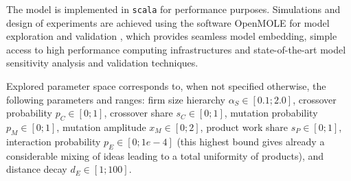 \documentclass[letterpaper]{article}
\begin{document}




The model is implemented in \texttt{scala} for performance purposes. Simulations and design of experiments are achieved using the software OpenMOLE for model exploration and validation \citep{reuillon2013openmole}, which provides seamless model embedding, simple access to high performance computing infrastructures and state-of-the-art model sensitivity analysis and validation techniques.

Explored parameter space corresponds to, when not specified otherwise, the following parameters and ranges: firm size hierarchy $\alpha_S \in [0.1 ; 2.0]$, crossover probability $p_C \in [0 ; 1]$, crossover share $s_C \in [0 ; 1]$, mutation probability $p_M \in [0 ; 1]$, mutation amplitude $x_M \in [0 ; 2]$, product work share $s_P \in [0 ; 1]$, interaction probability $p_E \in [0 ; 1e-4]$ (this highest bound gives already a considerable mixing of ideas leading to a total uniformity of products), and distance decay $d_E \in [1 ; 100]$.
\end{document}
